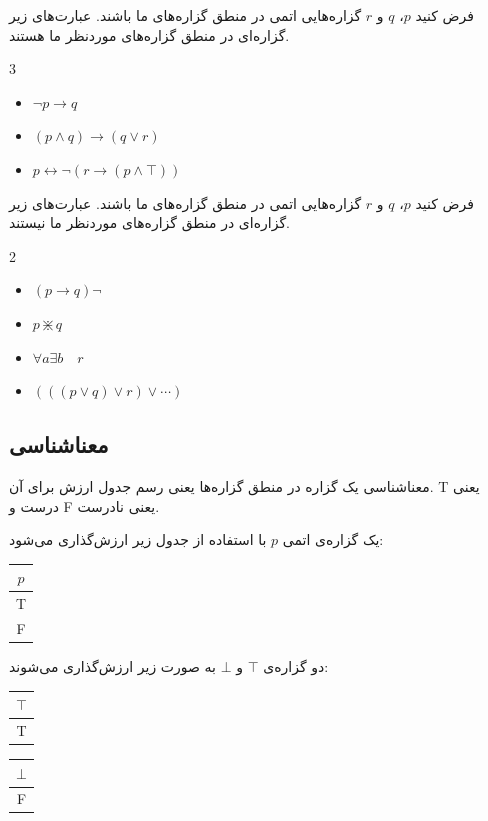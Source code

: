 \begin{example}
	فرض کنید
	$p$، $q$ و $r$
	گزاره‌هایی اتمی در منطق گزاره‌های ما باشند. عبارت‌های زیر گزاره‌ای در منطق گزاره‌های موردنظر ما هستند.
	\vspace{-0.5cm}
	\begin{multicols}{3}
		\begin{itemize}
			\item 
			$\neg p \rightarrow q$
			\item 
			$(p \wedge q) \rightarrow (q \vee r)$
			\item 
			$p \leftrightarrow \neg (r \rightarrow (p \wedge \top))$
		\end{itemize}
	\end{multicols}
\end{example}

\begin{example}
	فرض کنید
	$p$، $q$ و $r$
	گزاره‌هایی اتمی در منطق گزاره‌های ما باشند. عبارت‌های زیر گزاره‌ای در منطق گزاره‌های موردنظر ما نیستند.
	\vspace{-0.5cm}
	\begin{multicols}{2}
		\begin{itemize}
			\item 
			$(p \rightarrow q)\neg$
			\item 
			$p \divideontimes q$
			\item 
			$\forall a \exists b \quad r$
			\item 
			$(((p \vee q) \vee r) \vee \cdots)$
		\end{itemize}
	\end{multicols}
\end{example}

\subsection{معناشناسی}
معناشناسی یک گزاره در منطق گزاره‌ها یعنی رسم جدول ارزش برای آن. T یعنی درست و F یعنی نادرست.

یک گزاره‌ی اتمی $p$ با استفاده از جدول زیر ارزش‌گذاری می‌شود:
\vspace{-0.1cm}
\begin{table}[H]
	\centering
	\begin{tabular}{c}
		$p$ \\
		\hline
		T \\
		F
	\end{tabular}
\end{table}
دو گزاره‌ی
$\top$
و
$\bot$
به صورت زیر ارزش‌گذاری می‌شوند:
\vspace{-0.1cm}
\begin{table}[H]
	\centering
	\begin{tabular}{c}
		$\top$ \\
		\hline
		T
	\end{tabular}
	\qquad
	\begin{tabular}{c}
		$\bot$ \\
		\hline
		F
	\end{tabular}
\end{table}

